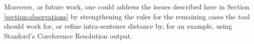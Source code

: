 \documentclass[11pt,a4paper,openright]{memoir}
\begin{document}
Moreover, as future work, one could address the issues described here in Section \ref{section:observations} by strengthening the rules for the remaining cases the tool should work for, or refine intra-sentence distance by, for an example, using Stanford's Coreference Resolution output.

\backmatter

\printbibliography

\appendix
\end{document}
